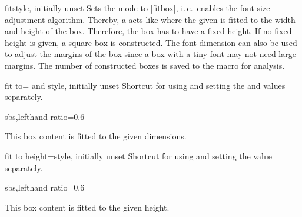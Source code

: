 \enlargethispage*{5mm}
\begin{docTcbKey}{fit}{}{style, initially unset}
  Sets the  mode to |fitbox|, i.\,e.\ enables the
  font size adjustment algorithm. Thereby, a  acts
  like  where the given  is fitted to
  the width and height of the box. Therefore, the box has to have a fixed height.
  If no fixed height is given, a square box is constructed.
  The font dimension  can also be used to adjust
  the margins of the box since a box with a tiny font may not need large
  margins. The number of constructed boxes is saved to the macro 
  for analysis.

\end{docTcbKey}


\clearpage
\begin{docTcbKey}{fit to}{= and }{style, initially unset}
  Shortcut for using  and setting the  and  values
  separately.
\begin{dispExample*}{sbs,lefthand ratio=0.6}

\begin{tcolorbox}[fit to=3cm and 2cm]
  This box content is fitted to the given
  dimensions.
\end{tcolorbox}
\end{dispExample*}
\end{docTcbKey}


\begin{docTcbKey}{fit to height}{=}{style, initially unset}
  Shortcut for using  and setting the  value separately.
\begin{dispExample*}{sbs,lefthand ratio=0.6}

\begin{tcolorbox}[fit to height=2cm]
  This box content is fitted to the given
  height.
\end{tcolorbox}
\end{dispExample*}
\end{docTcbKey}

